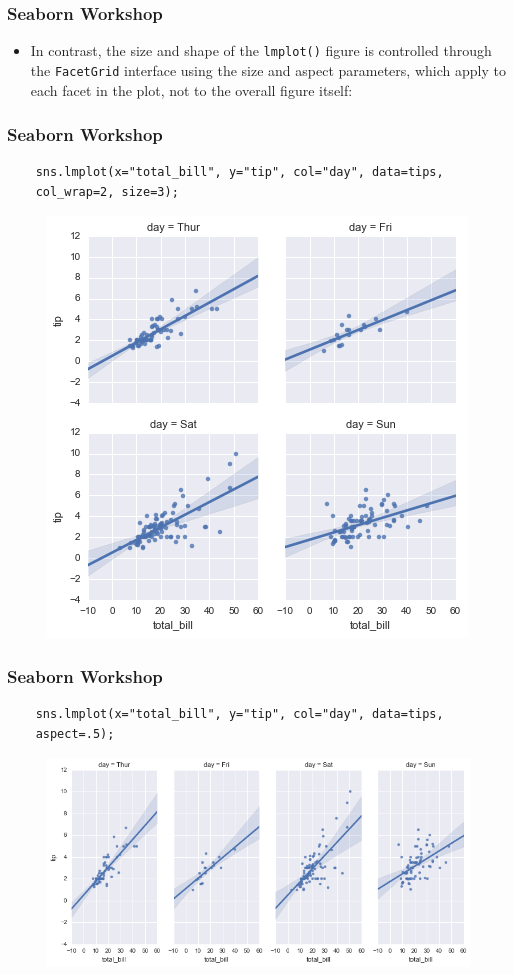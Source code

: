 \documentclass{beamer}
\begin{document}
\begin{frame}[fragile]
	\frametitle{Seaborn Workshop}
	\large
	\begin{itemize}
		\item In contrast, the size and shape of the \texttt{lmplot()} figure is controlled through the \texttt{FacetGrid} interface using the size and aspect parameters, which apply to each facet in the plot, not to the overall figure itself:
	\end{itemize}
	
\end{frame}
\begin{frame}[fragile]
	\frametitle{Seaborn Workshop}
	\large
	\begin{verbatim}
	sns.lmplot(x="total_bill", y="tip", col="day", data=tips,
	col_wrap=2, size=3);
	\end{verbatim}
	
	\begin{figure}
		\centering
		\includegraphics[width=0.55\linewidth]{images/regression_48_0}
	\end{figure}
\end{frame}
\begin{frame}[fragile]
	\frametitle{Seaborn Workshop}
	\large
	\begin{verbatim}
	sns.lmplot(x="total_bill", y="tip", col="day", data=tips,
	aspect=.5);
	\end{verbatim}
	
	\begin{figure}
		\centering
		\includegraphics[width=0.7\linewidth]{images/regression_49_0}
	\end{figure}
\end{frame}
\end{document}
